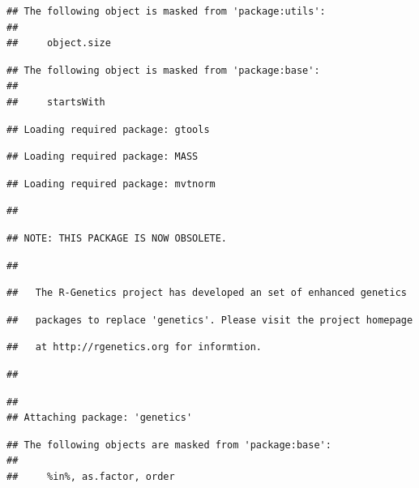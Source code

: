 \documentclass[
]{article}
\begin{document}
\begin{verbatim}
## The following object is masked from 'package:utils':
## 
##     object.size
\end{verbatim}

\begin{verbatim}
## The following object is masked from 'package:base':
## 
##     startsWith
\end{verbatim}

\begin{verbatim}
## Loading required package: gtools
\end{verbatim}

\begin{verbatim}
## Loading required package: MASS
\end{verbatim}

\begin{verbatim}
## Loading required package: mvtnorm
\end{verbatim}

\begin{verbatim}
## 
\end{verbatim}

\begin{verbatim}
## NOTE: THIS PACKAGE IS NOW OBSOLETE.
\end{verbatim}

\begin{verbatim}
## 
\end{verbatim}

\begin{verbatim}
##   The R-Genetics project has developed an set of enhanced genetics
\end{verbatim}

\begin{verbatim}
##   packages to replace 'genetics'. Please visit the project homepage
\end{verbatim}

\begin{verbatim}
##   at http://rgenetics.org for informtion.
\end{verbatim}

\begin{verbatim}
## 
\end{verbatim}

\begin{verbatim}
## 
## Attaching package: 'genetics'
\end{verbatim}

\begin{verbatim}
## The following objects are masked from 'package:base':
## 
##     %in%, as.factor, order
\end{verbatim}
\end{document}
